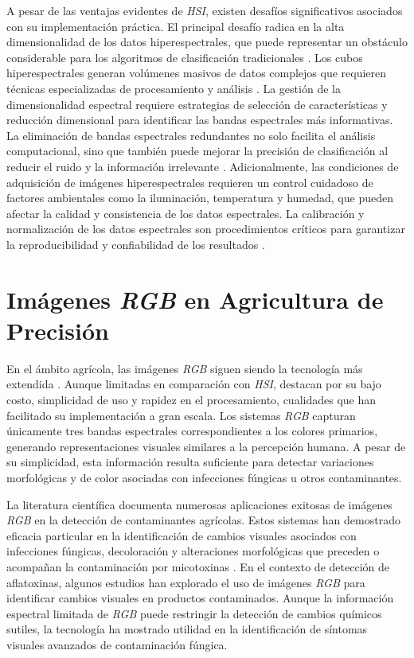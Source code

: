 A pesar de las ventajas evidentes de \emph{HSI}, existen desafíos significativos asociados con su implementación práctica. El principal desafío radica en la alta dimensionalidad de los datos hiperespectrales, que puede representar un obstáculo considerable para los algoritmos de clasificación tradicionales \cite{HONG201935, jimaging5050052}. Los cubos hiperespectrales generan volúmenes masivos de datos complejos que requieren técnicas especializadas de procesamiento y análisis \cite{jimaging5050052}. La gestión de la dimensionalidad espectral requiere estrategias de selección de características y reducción dimensional para identificar las bandas espectrales más informativas. La eliminación de bandas espectrales redundantes no solo facilita el análisis computacional, sino que también puede mejorar la precisión de clasificación al reducir el ruido y la información irrelevante \cite{Zhong}. Adicionalmente, las condiciones de adquisición de imágenes hiperespectrales requieren un control cuidadoso de factores ambientales como la iluminación, temperatura y humedad, que pueden afectar la calidad y consistencia de los datos espectrales. La calibración y normalización de los datos espectrales son procedimientos críticos para garantizar la reproducibilidad y confiabilidad de los resultados \cite{KHAN2022101678}.

\section{Imágenes \emph{RGB} en Agricultura de Precisión}

En el ámbito agrícola, las imágenes \emph{RGB} siguen siendo la tecnología más extendida \cite{FERENTINOS2018311}. Aunque limitadas en comparación con \emph{HSI}, destacan por su bajo costo, simplicidad de uso y rapidez en el procesamiento, cualidades que han facilitado su implementación a gran escala. Los sistemas \emph{RGB} capturan únicamente tres bandas espectrales correspondientes a los colores primarios, generando representaciones visuales similares a la percepción humana. A pesar de su simplicidad, esta información resulta suficiente para detectar variaciones morfológicas y de color asociadas con infecciones fúngicas u otros contaminantes.

\vspace{5mm}

La literatura científica documenta numerosas aplicaciones exitosas de imágenes \emph{RGB} en la detección de contaminantes agrícolas. Estos sistemas han demostrado eficacia particular en la identificación de cambios visuales asociados con infecciones fúngicas, decoloración y alteraciones morfológicas que preceden o acompañan la contaminación por micotoxinas \cite{FERENTINOS2018311}. En el contexto de detección de aflatoxinas, algunos estudios han explorado el uso de imágenes \emph{RGB} para identificar cambios visuales en productos contaminados. Aunque la información espectral limitada de \emph{RGB} puede restringir la detección de cambios químicos sutiles, la tecnología ha mostrado utilidad en la identificación de síntomas visuales avanzados de contaminación fúngica.

